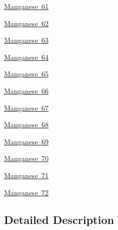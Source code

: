 \begin{DoxyCompactItemize}
\mbox{\hyperlink{group___isotope_const-_manganese-_mn61}{Manganese 61}}
\item 
\mbox{\hyperlink{group___isotope_const-_manganese-_mn62}{Manganese 62}}
\item 
\mbox{\hyperlink{group___isotope_const-_manganese-_mn63}{Manganese 63}}
\item 
\mbox{\hyperlink{group___isotope_const-_manganese-_mn64}{Manganese 64}}
\item 
\mbox{\hyperlink{group___isotope_const-_manganese-_mn65}{Manganese 65}}
\item 
\mbox{\hyperlink{group___isotope_const-_manganese-_mn66}{Manganese 66}}
\item 
\mbox{\hyperlink{group___isotope_const-_manganese-_mn67}{Manganese 67}}
\item 
\mbox{\hyperlink{group___isotope_const-_manganese-_mn68}{Manganese 68}}
\item 
\mbox{\hyperlink{group___isotope_const-_manganese-_mn69}{Manganese 69}}
\item 
\mbox{\hyperlink{group___isotope_const-_manganese-_mn70}{Manganese 70}}
\item 
\mbox{\hyperlink{group___isotope_const-_manganese-_mn71}{Manganese 71}}
\item 
\mbox{\hyperlink{group___isotope_const-_manganese-_mn72}{Manganese 72}}
\end{DoxyCompactItemize}


\subsection{Detailed Description}
